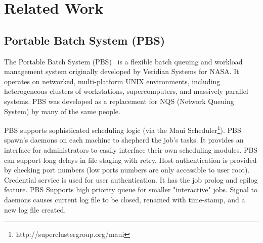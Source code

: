 \section{Related Work}
\subsection*{Portable Batch System (PBS)}

The Portable Batch System (PBS)~\cite{PBS}
is a flexible batch queuing and 
workload management system originally developed by Veridian Systems 
for NASA.  It operates on networked, multi-platform UNIX environments, 
including heterogeneous clusters of workstations, supercomputers, and 
massively parallel systems. PBS was developed as a replacement for 
NQS (Network Queuing System) by many of the same people.

PBS supports sophisticated scheduling logic (via the Maui 
Scheduler\footnote{http://superclustergroup.org/maui}). 
PBS spawn's daemons on each 
machine to shepherd the job's tasks.
It provides an interface for administrators to easily 
interface their own scheduling modules.  PBS can support 
long delays in file staging with retry.  Host 
authentication is provided by checking port numbers (low ports numbers are only 
accessible to user root).  Credential service is used for user authentication. 
It has the job prolog and epilog feature.
PBS Supports 
high priority queue for smaller "interactive" jobs.  Signal to daemons 
causes current log file to be closed, renamed with 
time-stamp, and a new log file created.

